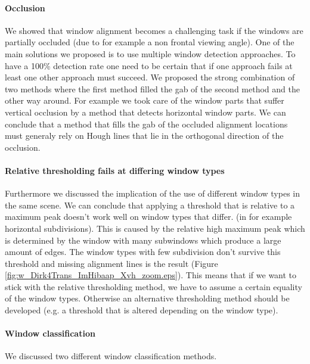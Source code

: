 	\paragraph{Occlusion}
	We showed that window alignment becomes a challenging task if the windows are partially
	occluded (due to for example a non frontal viewing angle).  One of the main solutions 
	we proposed is to use multiple window
	detection approaches.  To have a 100\% detection rate one need to be certain
	that if one approach fails at least one other approach must succeed.  We
	proposed the strong combination of two methods where the first method filled the
	gab of the second method and the other way around.
	For example we took care of the window parts that suffer vertical occlusion by a method that
	detects horizontal window parts.  We can conclude that a method that fills the
	gab of the occluded alignment locations must generaly rely on Hough lines that
	lie in the orthogonal direction of the occlusion.

	\paragraph{Relative thresholding fails at differing window types}
	Furthermore we discussed the implication of the use of different window types in
	the same scene.  We can conclude that applying a threshold that is relative to a
	maximum peak doesn't work well on window types that differ.  (in for example
	horizontal subdivisions).  This is caused by the relative high maximum peak
	which is determined by the window with many subwindows which produce a large
	amount of edges.  The window types with few subdivision don't survive this
	threshold and missing alignment lines is the result (Figure
	\ref{fig:w_Dirk4Trans_ImHibaap_Xvh_zoom.eps}).  This means that if we want to
	stick with the relative thresholding method, we have to assume a certain
	equality of the window types. Otherwise an alternative thresholding method
	should be developed (e.g. a threshold that is altered depending on the window
	type).



\paragraph{Window classification} %
	We discussed two different window classification methods. 
